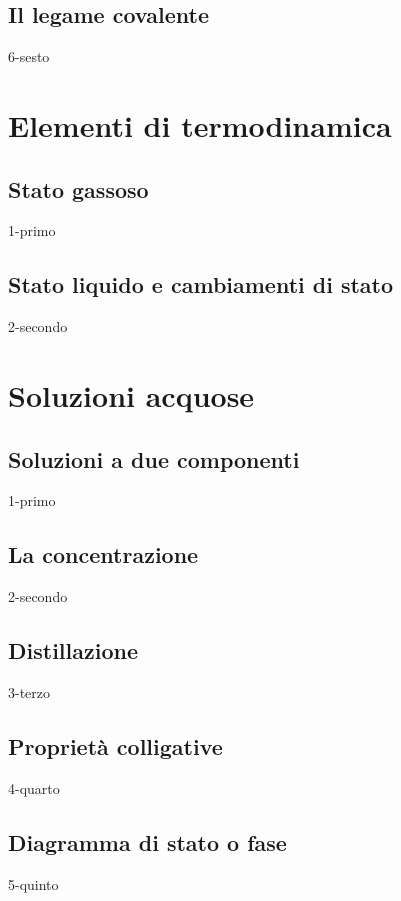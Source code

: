 \documentclass[openany,12pt]{book}%
\begin{document}
\newpage

\section{Il legame covalente}
{6-sesto}

\chapter{Elementi di termodinamica}

\section{Stato gassoso}
{1-primo}

\section{Stato liquido e cambiamenti di stato}
{2-secondo}

\chapter{Soluzioni acquose}

\section{Soluzioni a due componenti}
{1-primo}

\section{La concentrazione}
{2-secondo}

\section{Distillazione}
{3-terzo}

\section{Proprietà colligative}
{4-quarto}

\newpage

\section{Diagramma di stato o fase}
{5-quinto}
\end{document}
